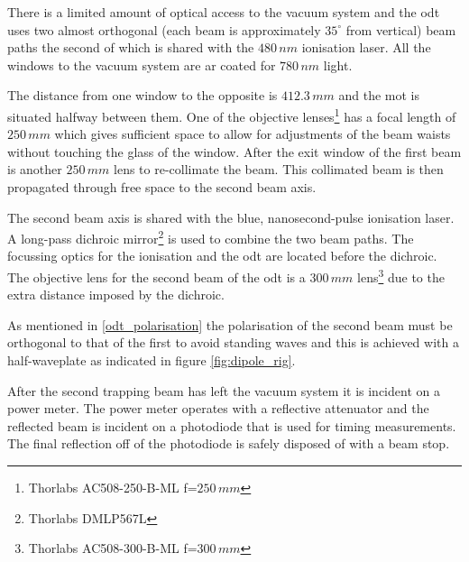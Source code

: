 There is a limited amount of optical access to the vacuum system and the \gls{odt} uses two almost orthogonal (each beam is approximately $35^{\circ}$ from vertical) beam paths the second of which is shared with the $480\,\unit{nm}$ ionisation laser. All the windows to the vacuum system are \gls{ar} coated for $780\,\unit{nm}$ light.

The distance from one window to the opposite is $412.3\,\unit{mm}$ and the \gls{mot} is situated halfway between them. One of the objective lenses\footnote{Thorlabs AC508-250-B-ML f=$250\,\unit{mm}$} has a focal length of $250\,\unit{mm}$ which gives sufficient space to allow for adjustments of the beam waists without touching the glass of the window. After the exit window of the first beam is another $250\,\unit{mm}$ lens to re-collimate the beam. This collimated beam is then propagated through free space to the second beam axis.

The second beam axis is shared with the blue, nanosecond-pulse ionisation laser. A long-pass dichroic mirror\footnote{Thorlabs DMLP567L} is used to combine the two beam paths. The focussing optics for the ionisation and the \gls{odt} are located before the dichroic. The objective lens for the second beam of the \gls{odt} is a $300\,\unit{mm}$ lens\footnote{Thorlabs AC508-300-B-ML f=$300\,\unit{mm}$} due to the extra distance imposed by the dichroic.

As mentioned in \ref{odt_polarisation} the polarisation of the second beam must be orthogonal to that of the first to avoid standing waves and this is achieved with a half-waveplate as indicated in figure \ref{fig:dipole_rig}.

After the second trapping beam has left the vacuum system it is incident on a power meter. The power meter operates with a reflective attenuator and the reflected beam is incident on a photodiode that is used for timing measurements. The final reflection off of the photodiode is safely disposed of with a beam stop.

